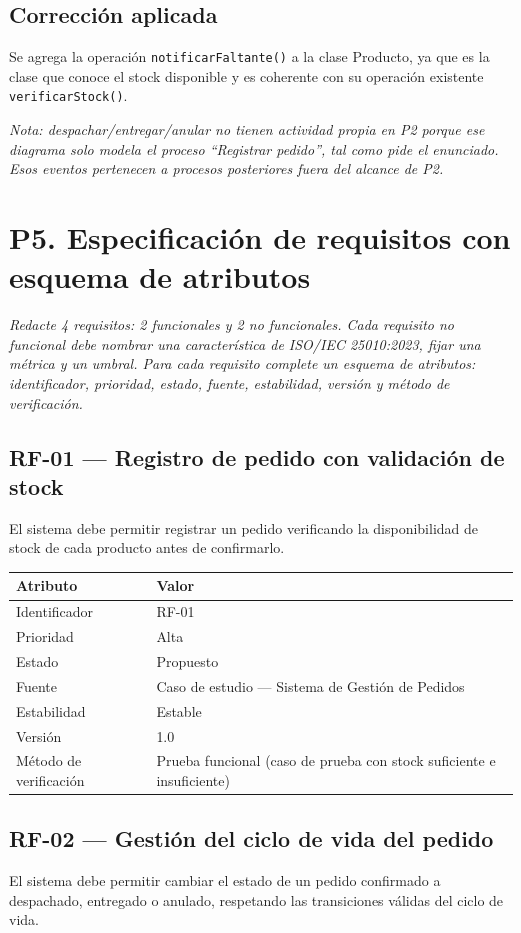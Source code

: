 \documentclass[11pt]{article}
\newcommand{\atributotabla}[1]{%
\begin{center}
\begin{tabular}{|p{4cm}|p{9cm}|}
\hline
\textbf{Atributo} & \textbf{Valor} \\
\hline
#1
\hline
\end{tabular}
\end{center}
}
\begin{document}
\subsection*{Corrección aplicada}
Se agrega la operación \texttt{notificarFaltante()} a la clase Producto, ya que es la clase que conoce el stock disponible y es coherente con su operación existente \texttt{verificarStock()}.

\textit{Nota: despachar/entregar/anular no tienen actividad propia en P2 porque ese diagrama solo modela el proceso ``Registrar pedido'', tal como pide el enunciado. Esos eventos pertenecen a procesos posteriores fuera del alcance de P2.}

\newpage

\section*{P5. Especificación de requisitos con esquema de atributos}

\textit{Redacte 4 requisitos: 2 funcionales y 2 no funcionales. Cada requisito no funcional debe nombrar una característica de ISO/IEC 25010:2023, fijar una métrica y un umbral. Para cada requisito complete un esquema de atributos: identificador, prioridad, estado, fuente, estabilidad, versión y método de verificación.}

\subsection*{RF-01 --- Registro de pedido con validación de stock}
El sistema debe permitir registrar un pedido verificando la disponibilidad de stock de cada producto antes de confirmarlo.

\atributotabla{
Identificador & RF-01 \\
\hline
Prioridad & Alta \\
\hline
Estado & Propuesto \\
\hline
Fuente & Caso de estudio --- Sistema de Gestión de Pedidos \\
\hline
Estabilidad & Estable \\
\hline
Versión & 1.0 \\
\hline
Método de verificación & Prueba funcional (caso de prueba con stock suficiente e insuficiente) \\
}

\subsection*{RF-02 --- Gestión del ciclo de vida del pedido}
El sistema debe permitir cambiar el estado de un pedido confirmado a despachado, entregado o anulado, respetando las transiciones válidas del ciclo de vida.
\end{document}
